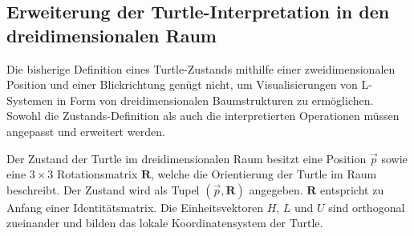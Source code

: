 \subsection{Erweiterung der Turtle-Interpretation in den dreidimensionalen Raum}

Die bisherige Definition eines Turtle-Zustands mithilfe einer zweidimensionalen Position und einer Blickrichtung genügt nicht, um Visualisierungen von L-Systemen in Form von dreidimensionalen Baumstrukturen zu ermöglichen. Sowohl die Zustands-Definition als auch die interpretierten Operationen müssen angepasst und erweitert werden.

Der Zustand der Turtle im dreidimensionalen Raum besitzt eine Position $\overrightarrow{p}$ sowie eine $3\times3$ Rotationsmatrix $\boldsymbol{R}$, welche die Orientierung der Turtle im Raum beschreibt. Der Zustand wird als Tupel $(\overrightarrow{p}, \boldsymbol{R})$ angegeben. $\boldsymbol{R}$ entspricht zu Anfang einer Identitätsmatrix. Die Einheitsvektoren $H$, $L$ und $U$  sind orthogonal zueinander und bilden das lokale Koordinatensystem der Turtle. 

